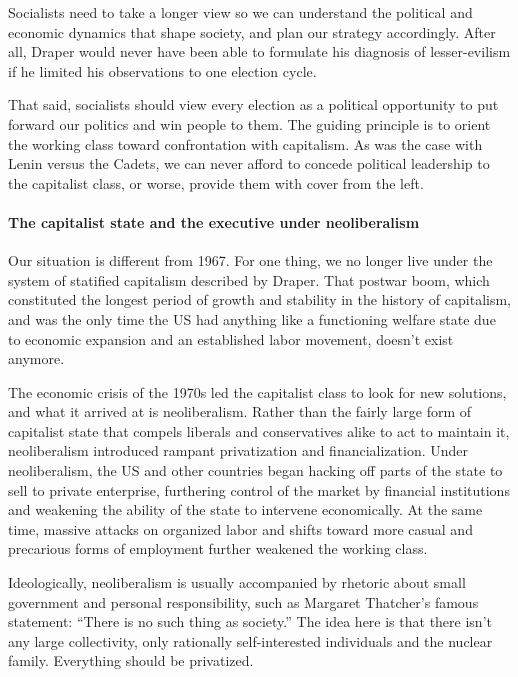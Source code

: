 Socialists need to take a longer view so we can understand the political and economic dynamics that shape society, and plan our strategy accordingly. After all, Draper would never have been able to formulate his diagnosis of lesser-evilism if he limited his observations to one election cycle.

That said, socialists should view every election as a political opportunity to put forward our politics and win people to them. The guiding principle is to orient the working class toward confrontation with capitalism. As was the case with Lenin versus the Cadets, we can never afford to concede political leadership to the capitalist class, or worse, provide them with cover from the left.

\paragraph{The capitalist state and the executive under neoliberalism}

Our situation is different from 1967. For one thing, we no longer live under the system of statified capitalism described by Draper. That postwar boom, which constituted the longest period of growth and stability in the history of capitalism, and was the only time the US had anything like a functioning welfare state due to economic expansion and an established labor movement, doesn't exist anymore.

The economic crisis of the 1970s led the capitalist class to look for new solutions, and what it arrived at is neoliberalism. Rather than the fairly large form of capitalist state that compels liberals and conservatives alike to act to maintain it, neoliberalism introduced rampant privatization and financialization. Under neoliberalism, the US and other countries began hacking off parts of the state to sell to private enterprise, furthering control of the market by financial institutions and weakening the ability of the state to intervene economically. At the same time, massive attacks on organized labor and shifts toward more casual and precarious forms of employment further weakened the working class.

Ideologically, neoliberalism is usually accompanied by rhetoric about small government and personal responsibility, such as Margaret Thatcher's famous statement: ``There is no such thing as society.'' The idea here is that there isn't any large collectivity, only rationally self-interested individuals and the nuclear family. Everything should be privatized.

